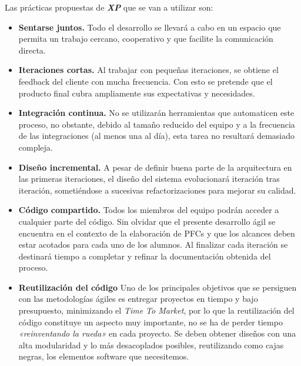 Las prácticas propuestas de \textbf{\textit{XP}} que se van a utilizar son: 

\begin{itemize}
\item \textbf{Sentarse juntos.} Todo el desarrollo se llevará a cabo en un espacio que permita un trabajo cercano, cooperativo y que facilite la comunicación directa. %

\item \textbf{Iteraciones cortas.}  Al trabajar con pequeñas iteraciones, se obtiene el feedback del cliente con mucha frecuencia. Con esto se pretende que el producto final cubra ampliamente sus expectativas y necesidades. 

\item \textbf{Integración continua.} No se utilizarán herramientas que automaticen este proceso, no obstante, debido al tamaño reducido del equipo y a la frecuencia de las integraciones (al menos una al día), esta tarea no resultará demasiado compleja. 

\item \textbf{Diseño incremental.} A pesar de definir buena parte de la arquitectura en las primeras iteraciones, el diseño del sistema evolucionará iteración tras iteración, sometiéndose a sucesivas refactorizaciones para mejorar su calidad.  

\item \textbf{Código compartido.} Todos los miembros del equipo podrán acceder a cualquier parte del código. Sin olvidar que el presente desarrollo ágil se encuentra en el contexto de la elaboración de PFCs y que los alcances deben estar acotados para cada uno de los alumnos. Al finalizar cada  iteración se destinará tiempo a completar y refinar la documentación obtenida del proceso.

\item \textbf{Reutilización del código} Uno de los principales objetivos que se persiguen con las metodologías ágiles es entregar proyectos en tiempo y bajo presupuesto, minimizando el \textit{Time To Market}, por lo que la reutilización del código constituye un aspecto muy importante, no se ha de perder tiempo \textit{«reinventando la rueda»} en cada proyecto. Se deben obtener diseños con una alta modularidad y lo más desacoplados posibles, reutilizando como cajas negras, los elementos software que necesitemos. 

\end{itemize}

